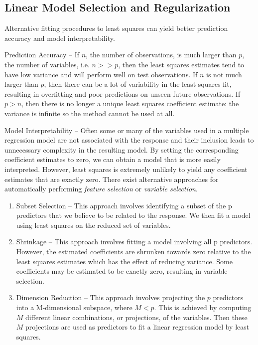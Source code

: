 \documentclass{article}
\numberwithin{equation}{section}
\begin{document}
\begin{enumerate}
\newpage
\section{Linear Model Selection and Regularization}
Alternative fitting procedures to least squares can yield better prediction accuracy and model interpretability.

Prediction Accuracy -- If $n$, the number of observations, is much larger than $p$, the number of variables, i.e. $n >>p$, then the least squares estimates tend to have low variance and will perform well on test observations. If $n$ is not much larger than $p$, then there can be a lot of variability in the least squares fit, resulting in overfitting and poor predictions on unseen future observations. If $p>n$, then there is no longer a unique least squares coefficient estimate: the variance is infinite so the method cannot be used at all.

Model Interpretability -- Often some or many of the variables used in a multiple regression model are not associated with the response and their inclusion leads to unnecessary complexity in the resulting model. By setting the corresponding coefficient estimates to zero, we can obtain a model that is more easily interpreted. However, least squares is extremely unlikely to yield any coefficient estimates that are exactly zero. There exist alternative approaches for automatically performing \textit{feature selection} or \textit{variable selection}.

\begin{enumerate}
    \item Subset Selection -- This approach involves identifying a subset of the p predictors that we believe to be related to the response. We then fit a model using least squares on the reduced set of variables.
    
    \item Shrinkage --  This approach involves fitting a model involving all p predictors. However, the estimated coefficients are shrunken towards zero relative to the least squares estimates which has the effect of reducing variance. Some coefficients may be estimated to be exactly zero, resulting in variable selection.
    
    \item Dimension Reduction -- This approach involves projecting the $p$ predictors into a M-dimensional subspace, where $M<p$. This is achieved by computing $M$ different linear combinations, or projections, of the variables. Then these $M$ projections are used as predictors to fit a linear regression model by least squares.
    

\end{enumerate}
\end{enumerate}
\end{document}
